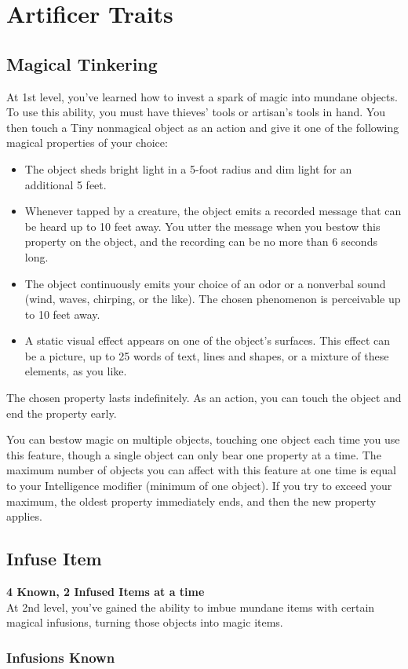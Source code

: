 \documentclass[letterpaper,openany,oneside,twocolumn]{book}
\begin{document}
\section*{Artificer Traits}
\subsection*{Magical Tinkering}
At 1st level, you've learned how to invest a spark of magic into mundane objects. To use this ability, you must have thieves' tools or artisan's tools in hand. You then touch a Tiny nonmagical object as an action and give it one of the following magical properties of your choice:
\begin{itemize}
	\item The object sheds bright light in a 5-foot radius and dim light for an additional 5 feet.
	\item Whenever tapped by a creature, the object emits a recorded message that can be heard up to 10 feet away. You utter the message when you bestow this property on the object, and the recording can be no more than 6 seconds long.
	\item The object continuously emits your choice of an odor or a nonverbal sound (wind, waves, chirping, or the like). The chosen phenomenon is perceivable up to 10 feet away.
	\item A static visual effect appears on one of the object's surfaces. This effect can be a picture, up to 25 words of text, lines and shapes, or a mixture of these elements, as you like.
\end{itemize}
The chosen property lasts indefinitely. As an action, you can touch the object and end the property early.

You can bestow magic on multiple objects, touching one object each time you use this feature, though a single object can only bear one property at a time. The maximum number of objects you can affect with this feature at one time is equal to your Intelligence modifier (minimum of one object). If you try to exceed your maximum, the oldest property immediately ends, and then the new property applies.
\subsection*{Infuse Item}
\textbf{4 Known, 2 Infused Items at a time}\\
At 2nd level, you've gained the ability to imbue mundane items with certain magical infusions, turning those objects into magic items.
\subsubsection*{Infusions Known}
\end{document}
